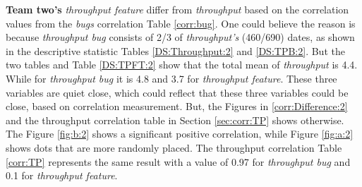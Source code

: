 \documentclass[UKenglish]{ifimaster}  %
\begin{document}
\textbf{Team two's} \textit{throughput feature} differ from \textit{throughput} based on the correlation values from the \textit{bugs} correlation Table \ref{corr:bug}. One could believe the reason is because \textit{throughput bug} consists of 2/3 of \textit{throughput's} (460/690) dates, as shown in the descriptive statistic Tables \ref{DS:Throughput:2} and \ref{DS:TPB:2}. But the two tables and Table \ref{DS:TPFT:2} show that the total mean of \textit{throughput} is 4.4. While for \textit{throughput bug} it is 4.8 and 3.7 for \textit{throughput feature}. These three variables are quiet close, which could reflect that these three variables could be close, based on correlation measurement. 
But, the Figures in \ref{corr:Difference:2} and the throughput correlation table in Section \ref{sec:corr:TP} shows otherwise. The Figure \ref{fig:b:2} shows a significant positive correlation, while Figure \ref{fig:a:2} shows dots that are more randomly placed. The throughput correlation Table \ref{corr:TP} represents the same result with a value of 0.97 for \textit{throughput bug} and  0.1 for \textit{throughput feature}.
\end{document}

